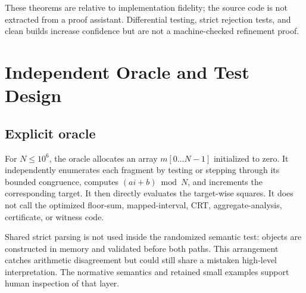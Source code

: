 \documentclass[11pt,onecolumn]{IEEEtran}
\begin{document}
These theorems are relative to implementation fidelity; the source code is not extracted from a proof assistant.  Differential testing, strict rejection tests, and clean builds increase confidence but are not a machine-checked refinement proof.

\section{Independent Oracle and Test Design}
\subsection{Explicit oracle}
For $N\leq10^6$, the oracle allocates an array $m[0\ldots N-1]$ initialized to zero.  It independently enumerates each fragment by testing or stepping through its bounded congruence, computes $(ai+b)\bmod N$, and increments the corresponding target.  It then directly evaluates the target-wise squares.  It does not call the optimized floor-sum, mapped-interval, CRT, aggregate-analysis, certificate, or witness code.

Shared strict parsing is not used inside the randomized semantic test: objects are constructed in memory and validated before both paths.  This arrangement catches arithmetic disagreement but could still share a mistaken high-level interpretation.  The normative semantics and retained small examples support human inspection of that layer.
\end{document}
